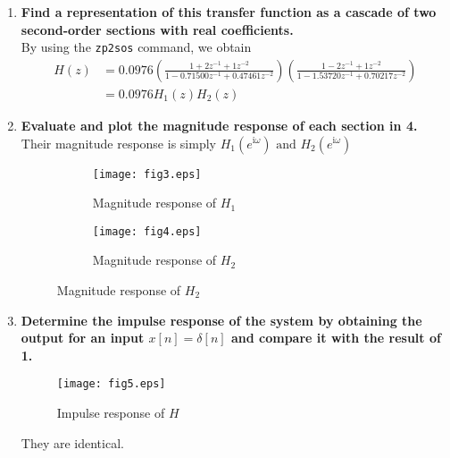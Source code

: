 \documentclass[12pt, a4paper]{article}
\newcommand{\img}{\mathrm{i}}
\begin{document}
\begin{enumerate}[label=(\alph*)]
    \clearpage

  \item {\bf Find a representation of this transfer function as a cascade of two second-order
    sections with real coefficients.} \\[12pt]
    By using the \texttt{zp2sos} command, we obtain
    \begin{align*}
      H(z) &= 0.0976 \left(\frac{ 1 + 2z^{-1} + 1z^{-2} }{ 1 - 0.71500z^{-1} + 0.47461z^{-2} }\right)
      \left(\frac{ 1 - 2z^{-1} + 1z^{-2} }{ 1 -1.53720 z^{-1} + 0.70217 z^{-2} } \right) \\
      &= 0.0976 H_1(z) H_2(z)
    \end{align*}

  \item {\bf Evaluate and plot the magnitude response of each section in 4.}\\[12pt]
    Their magnitude response is simply $H_1(e^{\img \omega}) \text{ and } H_2(e^{\img \omega})$

    \begin{figure}[H]
      \centering
      \begin{subfigure}{0.49\textwidth}
        \texttt{[image: fig3.eps]}
        \caption{Magnitude response of $H_1$}
      \end{subfigure} %
      \begin{subfigure}{0.49\textwidth}
        \texttt{[image: fig4.eps]}
        \caption{Magnitude response of $H_2$}
      \end{subfigure}
    \end{figure}

  \item {\bf Determine the impulse response of the system by obtaining the output for an input
    $x[n] = \delta[n]$ and compare it with the result of 1.}\\[-10pt]
    \begin{figure}[H]
      \centering
      \texttt{[image: fig5.eps]}
      \caption{Impulse response of $H$}
    \end{figure}
    They are identical.
\end{enumerate}
\end{document}
